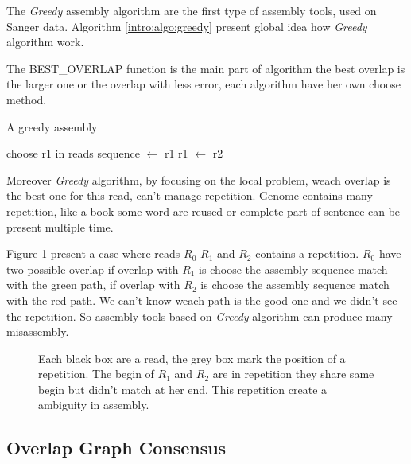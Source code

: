 \documentclass[main.tex]{subfiles}
\begin{document}
The \textit{Greedy} assembly algorithm are the first type of assembly tools, used on Sanger data. Algorithm \ref{intro:algo:greedy} present global idea how \textit{Greedy} algorithm work.

The BEST\_OVERLAP function is the main part of algorithm the best overlap is the larger one or the overlap with less error, each algorithm have her own choose method.

\begin{algorithm}[ht]
    \caption{A greedy assembly}
    \begin{algorithmic}[1]
        \State choose r1 in reads
        \State sequence $\leftarrow$ r1
            \State {}
            \State {}
            \State r1 $\leftarrow$ r2
        \EndWhile
    \EndFunction
    \end{algorithmic}
    \label{intro:algo:greedy}
\end{algorithm}

Moreover \textit{Greedy} algorithm, by focusing on the local problem, weach overlap is the best one for this read, can't manage repetition. Genome contains many repetition, like a book some word are reused or complete part of sentence can be present multiple time.

Figure \ref{intro:fig:greedy:repetition} present a case where reads $R_0$ $R_1$ and $R_2$ contains a repetition. $R_0$ have two possible overlap if overlap with $R_1$ is choose the assembly sequence match with the green path, if overlap with $R_2$ is choose the assembly sequence match with the red path. We can't know weach path is the good one and we didn't see the repetition. So assembly tools based on \textit{Greedy} algorithm can produce many misassembly.

\begin{figure}[ht]
    \centering 
    
    \caption{Each black box are a read, the grey box mark the position of a repetition. The begin of $R_1$ and $R_2$ are in repetition they share same begin but didn't match at her end. This repetition create a ambiguity in assembly.}
    \label{intro:fig:greedy:repetition}
\end{figure}

\subsection{Overlap Graph Consensus}
\end{document}
